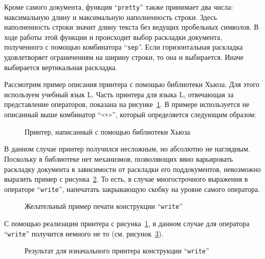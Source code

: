 

Кроме самого документа, функция “\lstinline[language=Haskell]{pretty}” также принимает два числа: максимальную длину и максимальную наполненность строки. Здесь наполненность строки значит длину текста без ведущих пробельных символов. В ходе работы этой функции и происходит выбор раскладки документа, полученного с помощью комбинатора “\lstinline[language=Haskell]{sep}”. Если горизонтальная раскладка удовлетворяет ограничениям на ширину строки, то она и выбирается. Иначе выбирается вертикальная раскладка.



Рассмотрим пример описания принтера с помощью библиотеки Хьюза. Для этого используем учебный язык L. Часть принтера для языка L, отвечающая за представление операторов, показана на рисунке~\ref{fig:lHughesPrinter}.
В примере используется не описанный выше комбинатор “\lstinline[language=Haskell]{<+>}”, который определяется следующим образом:



\begin{figure}[h!]
	
	\caption{Принтер, написанный с помощью библиотеки Хьюза}
	\label{fig:lHughesPrinter}
\end{figure}

В данном случае принтер получился несложным, но абсолютно не наглядным. Поскольку в библиотеке нет механизмов, позволяющих явно варьировать раскладку документа в зависимости от раскладки его поддокументов, невозможно выразить пример с рисунка~\ref{fig:lGoodWriteEx}.
То есть, в случае многострочного выражения в операторе “\lstinline[language=llang]{write}”, напечатать закрывающую скобку на уровне самого оператора.

\begin{figure}[h!]
	
	\caption{Желательный пример печати конструкции “\lstinline[language=llang]{write}”}
	\label{fig:lGoodWriteEx}
\end{figure}

С помощью реализации принтера с рисунка~\ref{fig:lHughesPrinter}, в данном случае для оператора “\lstinline[language=llang]{write}” получится немного не то (см. рисунок~\ref{fig:lCurWriteEx}).
\begin{figure}[h!]
	
	\caption{Результат для изначального принтера конструкции “\lstinline[language=llang]{write}”}
	\label{fig:lCurWriteEx}
\end{figure}

